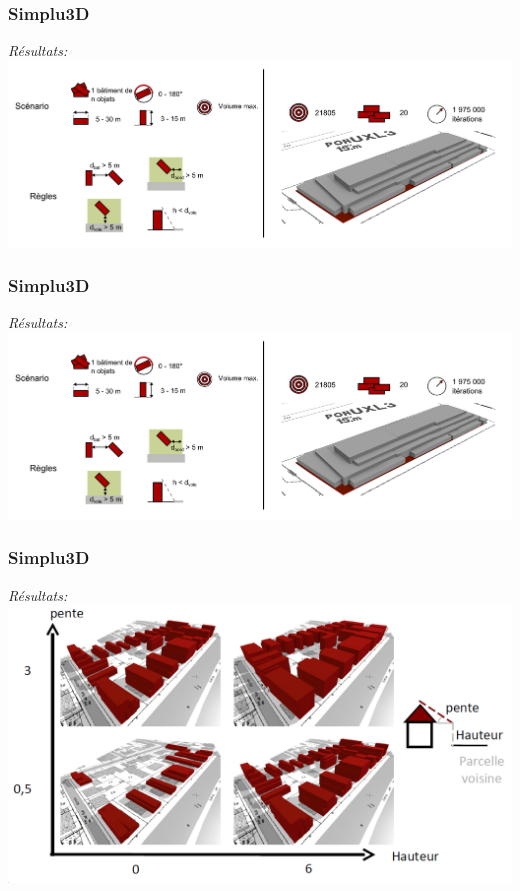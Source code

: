 \documentclass{beamer}
\begin{document}
\begin{frame}
\frametitle{Simplu3D}
\emph{R\'esultats:}
 \includegraphics[width=\textwidth]{simplu3D1.png}
\end{frame}

\begin{frame}
\frametitle{Simplu3D}
\emph{R\'esultats:}
 \includegraphics[width=\textwidth]{simplu3D1.png}
\end{frame}

\begin{frame}
\frametitle{Simplu3D}
\emph{R\'esultats:}
 \includegraphics[width=\textwidth]{simplu3D2.png}
\end{frame}
\end{document}
